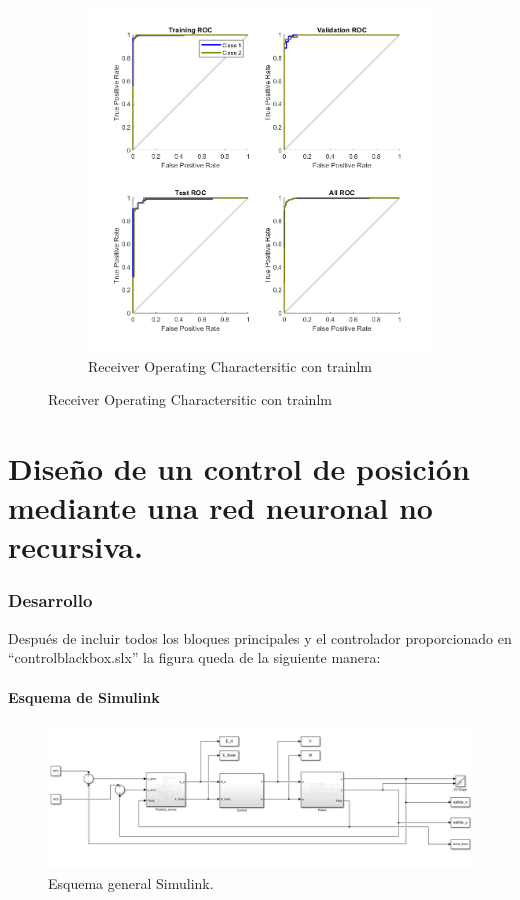 \documentclass[a4paper, 12pt]{article}
\begin{document}
\begin{figure}[htp!]
\begin{subfigure}{0.49\textwidth}
                        \includegraphics[width=\textwidth]{figures/parte1/Ej4/ej4_roc_trainlm_60.png}
                        \caption{Receiver Operating Charactersitic con trainlm}
                    \end{subfigure}
                \end{figure}
                \newpage
                
	\part{Diseño de un control de posición mediante una red neuronal no recursiva.}
	
	\section{Desarrollo}
	Después de incluir todos los bloques principales y el controlador proporcionado en “controlblackbox.slx” la figura queda de la siguiente manera:
	\subsection{Esquema de Simulink}
		\begin{figure}[htp!]
			\centering
			\includegraphics[width=1\textwidth]{figures/parte2/ejerA.png}
			\caption{Esquema general Simulink.}
		\end{figure}
		
\end{document}
